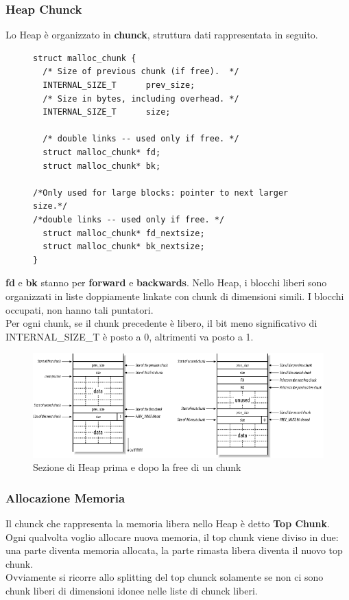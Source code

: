 \documentclass[a4paper,12pt]{article}
\begin{document}
\subsubsection{Heap Chunck}
Lo Heap è organizzato in \textbf{chunck}, struttura dati rappresentata in seguito.
\begin{figure}[H]
\begin{lstlisting}
struct malloc_chunk {
  /* Size of previous chunk (if free).  */
  INTERNAL_SIZE_T      prev_size;  
  /* Size in bytes, including overhead. */
  INTERNAL_SIZE_T      size;       

  /* double links -- used only if free. */
  struct malloc_chunk* fd;         
  struct malloc_chunk* bk;

/*Only used for large blocks: pointer to next larger size.*/
/*double links -- used only if free. */
  struct malloc_chunk* fd_nextsize; 
  struct malloc_chunk* bk_nextsize;
}
\end{lstlisting}
\end{figure}

\noindent\textbf{fd} e \textbf{bk} stanno per \textbf{forward} e \textbf{backwards}. Nello Heap, i blocchi liberi sono organizzati in liste doppiamente linkate con chunk di dimensioni simili. I blocchi occupati, non hanno tali puntatori.\\
Per ogni chunk, se il chunk precedente è libero, il bit meno significativo di INTERNAL\_SIZE\_T è posto a 0, altrimenti va posto a 1.

\begin{figure}[H]
	\centering
	\includegraphics[width=\linewidth]{Immagini/Heap1}
	\caption{Sezione di Heap prima e dopo la free di un chunk}
\end{figure}
\subsubsection{Allocazione Memoria}
\noindent Il chunck che rappresenta la memoria libera nello Heap è detto \textbf{Top Chunk}. Ogni qualvolta voglio allocare nuova memoria, il top chunk viene diviso in due: una parte diventa memoria allocata, la parte rimasta libera diventa il nuovo top chunk.\\ Ovviamente si ricorre allo splitting del top chunck solamente se non ci sono chunk liberi di dimensioni idonee nelle liste di chunck liberi.
\end{document}
